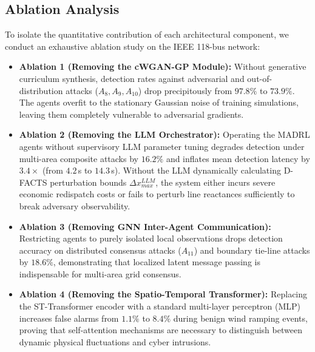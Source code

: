 \documentclass[journal,compsoc]{IEEEtran}
\begin{document}
\subsection{Ablation Analysis}
To isolate the quantitative contribution of each architectural component, we conduct an exhaustive ablation study on the IEEE 118-bus network:
\begin{itemize}
    \item \textbf{Ablation 1 (Removing the cWGAN-GP Module):} Without generative curriculum synthesis, detection rates against adversarial and out-of-distribution attacks ($A_8, A_9, A_{10}$) drop precipitously from $97.8\%$ to $73.9\%$. The agents overfit to the stationary Gaussian noise of training simulations, leaving them completely vulnerable to adversarial gradients.
    \item \textbf{Ablation 2 (Removing the LLM Orchestrator):} Operating the MADRL agents without supervisory LLM parameter tuning degrades detection under multi-area composite attacks by $16.2\%$ and inflates mean detection latency by $3.4\times$ (from $4.2$\,s to $14.3$\,s). Without the LLM dynamically calculating D-FACTS perturbation bounds $\Delta x_{max}^{LLM}$, the system either incurs severe economic redispatch costs or fails to perturb line reactances sufficiently to break adversary observability.
    \item \textbf{Ablation 3 (Removing GNN Inter-Agent Communication):} Restricting agents to purely isolated local observations drops detection accuracy on distributed consensus attacks ($A_{11}$) and boundary tie-line attacks by $18.6\%$, demonstrating that localized latent message passing is indispensable for multi-area grid consensus.
    \item \textbf{Ablation 4 (Removing the Spatio-Temporal Transformer):} Replacing the ST-Transformer encoder with a standard multi-layer perceptron (MLP) increases false alarms from $1.1\%$ to $8.4\%$ during benign wind ramping events, proving that self-attention mechanisms are necessary to distinguish between dynamic physical fluctuations and cyber intrusions.
\end{itemize}
\end{document}
